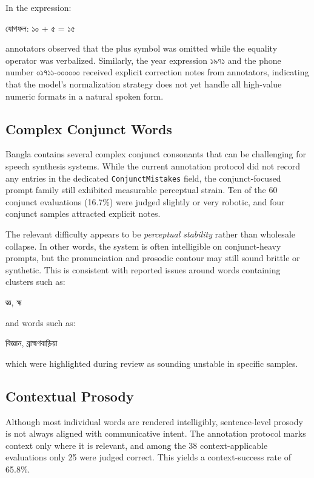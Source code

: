 In the expression:

\bengalifont
যোগফল: ১০ + ৫ = ১৫
\normalfont

annotators observed that the plus symbol was omitted while the equality operator was verbalized. Similarly, the year expression \bengalifont ১৯৭১ \normalfont and the phone number \bengalifont ০১৭১১-০০০০০০ \normalfont received explicit correction notes from annotators, indicating that the model's normalization strategy does not yet handle all high-value numeric formats in a natural spoken form.

\subsection{Complex Conjunct Words}

Bangla contains several complex conjunct consonants that can be challenging for speech synthesis systems. While the current annotation protocol did not record any entries in the dedicated \texttt{ConjunctMistakes} field, the conjunct-focused prompt family still exhibited measurable perceptual strain. Ten of the 60 conjunct evaluations (16.7\%) were judged slightly or very robotic, and four conjunct samples attracted explicit notes.

The relevant difficulty appears to be \textit{perceptual stability} rather than wholesale collapse. In other words, the system is often intelligible on conjunct-heavy prompts, but the pronunciation and prosodic contour may still sound brittle or synthetic. This is consistent with reported issues around words containing clusters such as:

\bengalifont
জ্ঞ, হ্ম
\normalfont

and words such as:

\bengalifont
বিজ্ঞান, ব্রাহ্মণবাড়িয়া
\normalfont

which were highlighted during review as sounding unstable in specific samples.

\subsection{Contextual Prosody}

Although most individual words are rendered intelligibly, sentence-level prosody is not always aligned with communicative intent. The annotation protocol marks context only where it is relevant, and among the 38 context-applicable evaluations only 25 were judged correct. This yields a context-success rate of 65.8\%.

